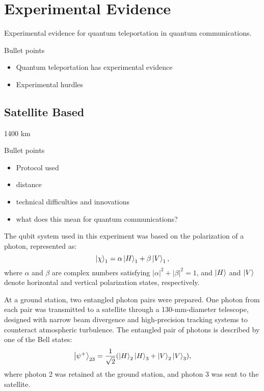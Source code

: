 \section{Experimental Evidence}
Experimental evidence for quantum teleportation in quantum communications.
\begin{mybox}{Bullet points}
    \begin{itemize}
        \item Quantum teleportation has experimental evidence
        \item Experimental hurdles
    \end{itemize}
\end{mybox}
\subsection{Satellite Based}

1400 km \cite{Ren:2017}
\begin{mybox}{Bullet points}
    \begin{itemize}
        \item Protocol used
        \item distance
        \item technical difficulties and innovations
        \item what does this mean for quantum communications?
    \end{itemize}
\end{mybox}

The qubit system used in this experiment was based on the polarization of a photon, represented as:  
\begin{equation}
    \ket{\chi}_1 = \alpha\ket{H}_1 + \beta\ket{V}_1,
\end{equation}
where \(\alpha\) and \(\beta\) are complex numbers satisfying \(|\alpha|^2 + |\beta|^2 = 1\), and \(\ket{H}\) and \(\ket{V}\) denote 
horizontal and vertical polarization states, respectively.  

At a ground station, two entangled photon pairs were prepared. One photon from each pair was transmitted to a satellite through a 
130-mm-diameter telescope, designed with narrow beam divergence and high-precision tracking systems to counteract atmospheric turbulence. 
The entangled pair of photons is described by one of the Bell states:
\begin{equation}
    \ket{\psi^{+}}_{23} = \frac{1}{\sqrt{2}} (\ket{H}_2\ket{H}_3 + \ket{V}_2\ket{V}_3),
\end{equation}
where photon 2 was retained at the ground station, and photon 3 was sent to the satellite.

